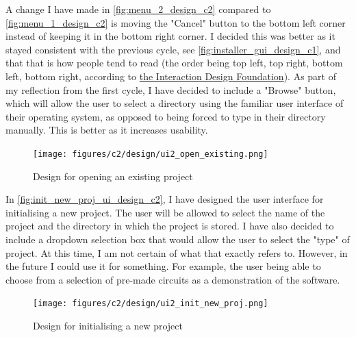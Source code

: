 \documentclass[11pt]{article}
\begin{document}
                A change I have made in \autoref{fig:menu_2_design_c2} compared to \autoref{fig:menu_1_design_c2} is moving the "Cancel" button to the bottom left corner instead of keeping it in the bottom right corner. I decided this was better as it stayed consistent with the previous cycle, see \autoref{fig:installer_gui_design_c1}, and that that is how people tend to read (the order being top left, top right, bottom left, bottom right, according to \href{https://www.interaction-design.org/literature/article/visual-hierarchy-organizing-content-to-follow-natural-eye-movement-patterns}{the Interaction Design Foundation}). As part of my reflection from the first cycle, I have decided to include a "Browse" button, which will allow the user to select a directory using the familiar user interface of their operating system, as opposed to being forced to type in their directory manually. This is better as it increases usability. 

                \begin{figure}[!ht]
                    \centering
                    \texttt{[image: figures/c2/design/ui2\_open\_existing.png]}
                    \caption{Design for opening an existing project}
                    \label{fig:menu_2_design_c2}
                \end{figure}

                \newpage
                In \autoref{fig:init_new_proj_ui_design_c2}, I have designed the user interface for initialising a new project. The user will be allowed to select the name of the project and the directory in which the project is stored. I have also decided to include a dropdown selection box that would allow the user to select the "type" of project. At this time, I am not certain of what that exactly refers to. However, in the future I could use it for something. For example, the user being able to choose from a selection of pre-made circuits as a demonstration of the software.

                \begin{figure}[!ht]
                    \centering
                    \texttt{[image: figures/c2/design/ui2\_init\_new\_proj.png]}
                    \caption{Design for initialising a new project}
                    \label{fig:init_new_proj_ui_design_c2}
                \end{figure}
\end{document}
